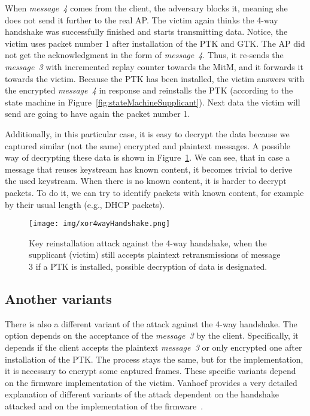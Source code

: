 When \textit{message~4} comes from the client, the adversary blocks it, meaning she does not send it further to the real AP. The victim again thinks the 4-way handshake was successfully finished and starts transmitting data. Notice, the victim uses packet number 1 after installation of the PTK and GTK. The AP did not get the acknowledgment in the form of \textit{message~4}. Thus, it re-sends the \textit{message~3} with incremented replay counter towards the MitM, and it forwards it towards the victim. Because the PTK has been installed, the victim answers with the encrypted \textit{message~4} in response and reinstalls the PTK (according to the state machine in Figure~\ref{fig:stateMachineSupplicant}). Next data the victim will send are going to have again the packet number 1. 

Additionally, in this particular case, it is easy to decrypt the data because we captured similar (not the same) encrypted and plaintext messages. A possible way of decrypting these data is shown in Figure~\ref{fig:4wayAttackWithDecryption}. We can see, that in case a message that reuses keystream has known content, it becomes trivial to derive the used keystream. When there is no known content, it is harder to decrypt packets. To do it, we can try to identify packets with known content, for example by their usual length (e.g., DHCP packets). 

\begin{figure}[h!]
  \centering
  \texttt{[image: img/xor4wayHandshake.png]}
  \caption[KRACK Attack against the 4-way handshake with possible data decryption]{Key reinstallation attack against the 4-way handshake, when the supplicant (victim) still accepts plaintext retransmissions of message 3 if a PTK is installed, possible decryption of data is designated.}
  \label{fig:4wayAttackWithDecryption}
\end{figure}

\subsection{Another variants}

There is also a different variant of the attack against the 4-way handshake. The option depends on the acceptance of the \textit{message~3} by the client. Specifically, it depends if the client accepts the plaintext \textit{message~3} or only encrypted one after installation of the PTK. The process stays the same, but for the implementation, it is necessary to encrypt some captured frames. These specific variants depend on the firmware implementation of the victim. Vanhoef provides a very detailed explanation of different variants of the attack dependent on the handshake attacked and on the implementation of the firmware~\cite{VA_ccs2017, VA_ccs2018}. 

